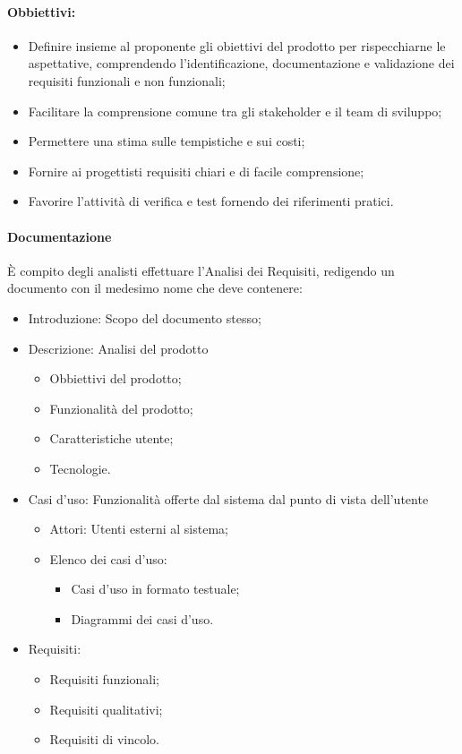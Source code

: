 \documentclass{article}
\begin{document}
\paragraph{Obbiettivi:}
\begin{itemize}
    \item Definire insieme al proponente gli obiettivi del prodotto per rispecchiarne le aspettative, comprendendo l'identificazione, documentazione e validazione dei requisiti funzionali e non funzionali;
    \item Facilitare la comprensione comune tra gli stakeholder e il team di sviluppo;
    \item Permettere una stima sulle tempistiche e sui costi;
    \item Fornire ai progettisti requisiti chiari e di facile comprensione;
    \item Favorire l'attività di verifica e test fornendo dei riferimenti pratici.
\end{itemize}

\paragraph{Documentazione}
È compito degli analisti effettuare l'Analisi dei Requisiti, redigendo un documento con il
medesimo nome che deve contenere:
\begin{itemize}
    \item Introduzione: Scopo del documento stesso;
    \item Descrizione: Analisi del prodotto
          \begin{itemize}
              \item Obbiettivi del prodotto;
              \item Funzionalità del prodotto;
              \item Caratteristiche utente;
              \item Tecnologie.
          \end{itemize}
    \item  Casi d'uso: Funzionalità offerte dal sistema dal punto di vista dell'utente
        \begin{itemize}
            \item Attori: Utenti esterni al sistema;
            \item Elenco dei casi d'uso:
            \begin{itemize}
                \item Casi d'uso in formato testuale;
                \item Diagrammi dei casi d'uso.
            \end{itemize}  
        \end{itemize}
    \item Requisiti:
        \begin{itemize}
            \item Requisiti funzionali;
            \item Requisiti qualitativi;
            \item Requisiti di vincolo.
        \end{itemize}
\end{itemize}
\end{document}
